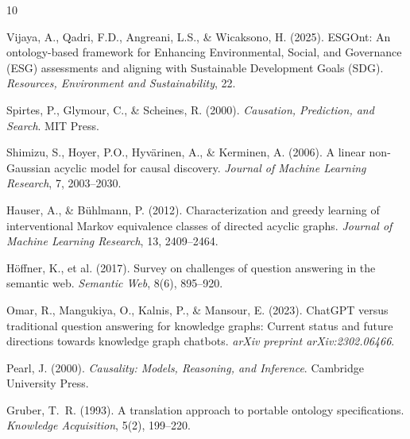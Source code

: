 \documentclass[a4paper,11pt,oneside]{article}
\begin{document}
\begin{thebibliography}{10}

Vijaya, A., Qadri, F.D., Angreani, L.S., \& Wicaksono, H. (2025).
ESGOnt: An ontology-based framework for Enhancing Environmental, Social, and Governance (ESG) assessments and aligning with Sustainable Development Goals (SDG).
\textit{Resources, Environment and Sustainability}, 22.

Spirtes, P., Glymour, C., \& Scheines, R. (2000).
\textit{Causation, Prediction, and Search}. MIT Press.

Shimizu, S., Hoyer, P.O., Hyv\"{a}rinen, A., \& Kerminen, A. (2006).
A linear non-Gaussian acyclic model for causal discovery.
\textit{Journal of Machine Learning Research}, 7, 2003--2030.

Hauser, A., \& B\"{u}hlmann, P. (2012).
Characterization and greedy learning of interventional Markov equivalence classes of directed acyclic graphs.
\textit{Journal of Machine Learning Research}, 13, 2409--2464.

H\"{o}ffner, K., et al. (2017).
Survey on challenges of question answering in the semantic web.
\textit{Semantic Web}, 8(6), 895--920.

Omar, R., Mangukiya, O., Kalnis, P., \& Mansour, E. (2023).
ChatGPT versus traditional question answering for knowledge graphs: Current status and future directions towards knowledge graph chatbots.
\textit{arXiv preprint arXiv:2302.06466}.

Pearl, J. (2000).
\textit{Causality: Models, Reasoning, and Inference}. Cambridge University Press.

Gruber, T.~R. (1993).
A translation approach to portable ontology specifications.
\textit{Knowledge Acquisition}, 5(2), 199--220.

\end{thebibliography}
\end{document}
